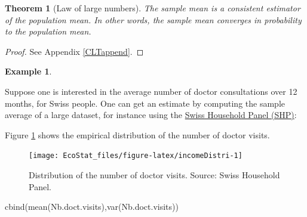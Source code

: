 \documentclass[
  12pt,
]{book}
\newenvironment{Shaded}{\begin{snugshade}}{\end{snugshade}}
\newcommand{\AttributeTok}[1]{\textcolor[rgb]{0.77,0.63,0.00}{#1}}
\newcommand{\CommentTok}[1]{\textcolor[rgb]{0.56,0.35,0.01}{\textit{#1}}}
\newcommand{\DecValTok}[1]{\textcolor[rgb]{0.00,0.00,0.81}{#1}}
\newcommand{\FunctionTok}[1]{\textcolor[rgb]{0.00,0.00,0.00}{#1}}
\newcommand{\NormalTok}[1]{#1}
\newcommand{\OtherTok}[1]{\textcolor[rgb]{0.56,0.35,0.01}{#1}}
\newcommand{\SpecialCharTok}[1]{\textcolor[rgb]{0.00,0.00,0.00}{#1}}
\newtheorem{theorem}{Theorem}[chapter]
\theoremstyle{definition}
\theoremstyle{definition}
\newtheorem{example}{Example}[chapter]
\theoremstyle{definition}
\theoremstyle{definition}
\theoremstyle{remark}
\begin{document}
\begin{theorem}[Law of large numbers]
\protect\hypertarget{thm:LLN}{}\label{thm:LLN}The sample mean is a consistent estimator of the population mean. In other words, the sample mean converges in probability to the population mean.
\end{theorem}

\begin{proof}
See Appendix \ref{CLTappend}.
\end{proof}

\begin{example}
\protect\hypertarget{exm:doctorVisits}{}\label{exm:doctorVisits}

Suppose one is interested in the average number of doctor consultations over 12 months, for Swiss people. One can get an estimate by computing the sample average of a large dataset, for instance using the \href{https://forscenter.ch/projects/swiss-household-panel/}{Swiss Household Panel (SHP)}:

Figure \ref{fig:incomeDistri} shows the empirical distribution of the number of doctor visits.

\begin{Shaded}
\end{Shaded}

\begin{figure}
\texttt{[image: EcoStat\_files/figure-latex/incomeDistri-1]} \caption{Distribution of the number of doctor visits. Source: Swiss Household Panel.}\label{fig:incomeDistri}
\end{figure}

\begin{Shaded}
\begin{Highlighting}[]
\FunctionTok{cbind}\NormalTok{(}\FunctionTok{mean}\NormalTok{(Nb.doct.visits),}\FunctionTok{var}\NormalTok{(Nb.doct.visits))}
\end{Highlighting}
\end{Shaded}


\end{example}
\end{document}
